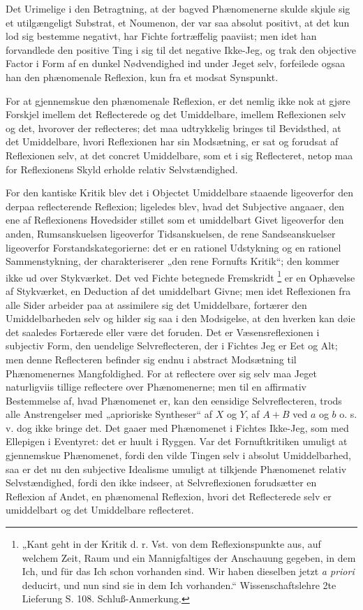 \documentclass[11pt]{book}
\newcommand{\opage}[1]{\marginnote{\footnotesize\textit{[#1]}}}
\begin{document}
Det Urimelige i den Betragtning, at der bagved Phænomenerne skulde skjule sig et utilgængeligt Substrat, et Noumenon, der var saa absolut positivt, at det kun lod sig bestemme negativt, har Fichte fortræffelig paaviist; men idet han forvandlede den positive Ting i sig til det negative Ikke-Jeg, og trak den objective Factor i Form af en dunkel Nødvendighed ind under Jeget selv, forfeilede ogsaa han den phænomenale Reflexion, kun fra et modsat Synspunkt.

For at gjennemskue den phænomenale Reflexion, er det nemlig ikke nok at gjøre Forskjel imellem det Reflecterede og det Umiddelbare, imellem Reflexionen selv og det, hvorover der reflecteres; det maa udtrykkelig bringes til Bevidsthed, at det Umiddelbare, hvori Reflexionen har sin Modsætning, er sat og forudsat af Reflexionen selv, at det concret Umiddelbare, som et i sig Reflecteret, netop maa for Reflexionens Skyld erholde relativ Selvstændighed.

For den kantiske Kritik blev det i Objectet Umiddelbare staaende ligeoverfor den derpaa reflecterende Reflexion; ligeledes blev, hvad det Subjective angaaer, den ene af Reflexionens Hovedsider stillet som et umiddelbart Givet ligeoverfor den anden, Rumsanskuelsen ligeoverfor Tidsanskuelsen, de rene Sandseanskuelser ligeoverfor Forstandskategorierne: det er en rationel Udstykning og en rationel Sammenstykning, der charakteriserer „den rene Fornufts Kritik“; den kommer ikke ud over Stykværket. Det ved Fichte betegnede Fremskridt%
\footnote{„Kant geht in der Kritik d. r. Vst. von dem Reflexionspunkte aus, auf welchem Zeit, Raum und ein Mannigfaltiges der Anschauung gegeben, in dem Ich, und für das Ich schon vorhanden sind. Wir haben dieselben jetzt \textit{a priori} deducirt, und nun sind sie in dem Ich vorhanden.“ Wissenschaftslehre 2te Lieferung S. 108. Schluß-Anmerkung.} er
\opage{81} \setcounter{footnote}{0}%
en Ophævelse af Stykværket, en Deduction af det umiddelbart Givne; men idet Reflexionen fra alle Sider arbeider paa at assimilere sig det Umiddelbare, fortærer den Umiddelbarheden selv og hilder sig saa i den Modsigelse, at den hverken kan døie det saaledes Fortærede eller være det foruden. Det er Væsensreflexionen i subjectiv Form, den uendelige Selvreflecteren, der i Fichtes Jeg er Eet og Alt; men denne Reflecteren befinder sig endnu i abstract Modsætning til Phænomenernes Mangfoldighed. For at reflectere over sig selv maa Jeget naturligviis tillige reflectere over Phænomenerne; men til en affirmativ Bestemmelse af, hvad Phænomenet er, kan den eensidige Selvreflecteren, trods alle Anstrengelser med „aprioriske Syntheser“ af $X$ og $Y$, af $A + B$ ved $a$ og $b$ o. s. v. dog ikke bringe det. Det gaaer med Phænomenet i Fichtes Ikke-Jeg, som med Ellepigen i Eventyret: det er huult i Ryggen. Var det Fornuftkritiken umuligt at gjennemskue Phænomenet, fordi den vilde Tingen selv i absolut Umiddelbarhed, saa er det nu den subjective Idealisme umuligt at tilkjende Phænomenet relativ Selvstændighed, fordi den ikke indseer, at Selvreflexionen forudsætter en Reflexion af Andet, en phænomenal Reflexion, hvori det Reflecterede selv er umiddelbart og det Umiddelbare reflecteret.
\end{document}

